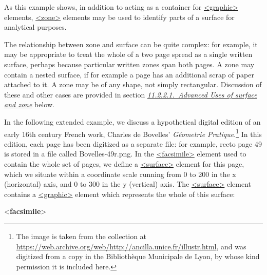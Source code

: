 As this example shows, in addition to acting as a container for \hyperref[TEI.graphic]{<graphic>} elements, \hyperref[TEI.zone]{<zone>} elements may be used to identify parts of a surface for analytical purposes.\par
The relationship between zone and surface can be quite complex: for example, it may be appropriate to treat the whole of a two page spread as a single written surface, perhaps because particular written zones span both pages. A zone may contain a nested surface, if for example a page has an additional scrap of paper attached to it. A zone may be of any shape, not simply rectangular. Discussion of these and other cases are provided in section \textit{\hyperref[PH-surfzone]{11.2.2.1.\ Advanced Uses of surface and zone}} below.\par
In the following extended example, we discuss a hypothetical digital edition of an early 16th century French work, Charles de Bovelles' \textit{Géometrie Pratique}.\footnote{The image is taken from the collection at \url{https://web.archive.org/web/http://ancilla.unice.fr/illustr.html}, and was digitized from a copy in the Bibliothèque Municipale de Lyon, by whose kind permission it is included here.} In this edition, each page has been digitized as a separate file: for example, recto page 49 is stored in a file called \textsf{Bovelles-49r.png}. In the \hyperref[TEI.facsimile]{<facsimile>} element used to contain the whole set of pages, we define a \hyperref[TEI.surface]{<surface>} element for this page, which we situate within a coordinate scale running from 0 to 200 in the x (horizontal) axis, and 0 to 300 in the y (vertical) axis. The \hyperref[TEI.surface]{<surface>} element contains a \hyperref[TEI.graphic]{<graphic>} element which represents the whole of this surface: \par\bgroup{}\exampleFont \begin{shaded}\noindent\mbox{}{<\textbf{facsimile}>}\mbox{}\newline 
{}\mbox{}\newline 

\end{shaded}
